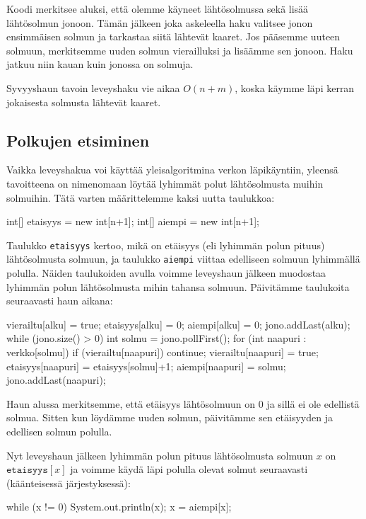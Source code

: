 Koodi merkitsee aluksi, että olemme käyneet lähtösolmussa
sekä lisää lähtösolmun jonoon.
Tämän jälkeen joka askeleella haku valitsee
jonon ensimmäisen solmun ja tarkastaa siitä lähtevät kaaret.
Jos pääsemme uuteen solmuun, merkitsemme uuden solmun
vierailluksi ja lisäämme sen jonoon.
Haku jatkuu niin kauan kuin jonossa on solmuja.

Syvyyshaun tavoin leveyshaku vie aikaa $O(n+m)$,
koska käymme läpi kerran jokaisesta solmusta lähtevät kaaret.

\subsection{Polkujen etsiminen}

Vaikka leveyshakua voi käyttää yleisalgoritmina verkon läpikäyntiin,
yleensä tavoitteena on nimenomaan löytää lyhimmät polut lähtösolmusta
muihin solmuihin. Tätä varten määrittelemme kaksi uutta taulukkoa:

\begin{code}
int[] etaisyys = new int[n+1];
int[] aiempi = new int[n+1];
\end{code}

Taulukko \texttt{etaisyys} kertoo, mikä on etäisyys
(eli lyhimmän polun pituus) lähtösolmusta solmuun,
ja taulukko \texttt{aiempi} viittaa edelliseen solmuun lyhimmällä polulla.
Näiden taulukoiden avulla voimme leveyshaun jälkeen muodostaa
lyhimmän polun lähtösolmusta mihin tahansa solmuun.
Päivitäm\-me taulukoita seuraavasti haun aikana:

\begin{code}
vierailtu[alku] = true;
etaisyys[alku] = 0;
aiempi[alku] = 0;
jono.addLast(alku);
while (jono.size() > 0) {
    int solmu = jono.pollFirst();
    for (int naapuri : verkko[solmu]) {
        if (vierailtu[naapuri]) continue;
        vierailtu[naapuri] = true;
        etaisyys[naapuri] = etaisyys[solmu]+1;
        aiempi[naapuri] = solmu;
        jono.addLast(naapuri);
    }
}
\end{code}

Haun alussa merkitsemme, että etäisyys lähtösolmuun on 0
ja sillä ei ole edellistä solmua.
Sitten kun löydämme uuden solmun, päivitämme sen etäisyyden
ja edellisen solmun polulla.

Nyt leveyshaun jälkeen lyhimmän polun pituus lähtösolmusta
solmuun $x$ on $\texttt{etaisyys}[x]$ ja voimme käydä läpi polulla
olevat solmut seuraavasti (käänteisessä järjestyksessä):

\begin{code}
while (x != 0) {
    System.out.println(x);
    x = aiempi[x];
}
\end{code}


